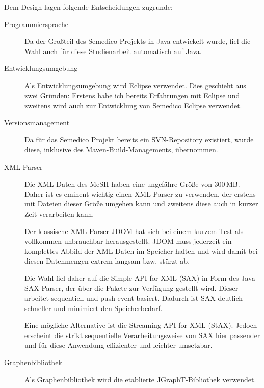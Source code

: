 Dem Design lagen folgende Entscheidungen zugrunde:
\begin{description}
\item[Programmiersprache]
Da der Großteil des Semedico Projekts in Java entwickelt wurde, fiel die Wahl auch für diese Studienarbeit automatisch auf Java. \par


\item[Entwicklungsumgebung]
Als Entwicklungsumgebung wird Eclipse verwendet. Dies geschieht aus zwei Gründen: Erstens habe ich bereits Erfahrungen mit Eclipse und zweitens wird auch zur Entwicklung von Semedico Eclipse verwendet. 

\item[Versionsmanagement]
Da für das Semedico Projekt bereits ein SVN-Repository existiert, wurde diese, inklusive des Maven-Build-Managements, übernommen.

\item[XML-Parser]
Die XML-Daten des MeSH haben eine ungefähre Größe von 300\,MB. Daher ist es eminent wichtig einen XML-Parser zu verwenden, der erstens mit Dateien dieser Größe umgehen kann und zweitens diese auch in kurzer Zeit verarbeiten kann. \par 

Der klassische XML-Parser JDOM hat sich bei einem kurzem Test als vollkommen unbrauchbar herausgestellt. JDOM muss jederzeit ein komplettes Abbild der XML-Daten im Speicher halten und wird damit bei diesen Datenmengen extrem langsam bzw. stürzt ab. \par

Die Wahl fiel daher auf die Simple API for XML (SAX) in Form des Java-SAX-Parser, der über die Pakete  zur Verfügung gestellt wird. Dieser arbeitet sequentiell und push-event-basiert. Dadurch ist SAX deutlich schneller und minimiert den Speicherbedarf. \par

Eine mögliche Alternative ist die Streaming API for XML (StAX). Jedoch erscheint die strikt sequentielle Verarbeitungsweise von SAX hier passender und für diese Anwendung effizienter und leichter umsetzbar.

\item[Graphenbibliothek]
Als Graphenbibliothek wird die etablierte JGraphT-Bibliothek verwendet. 
\end{description}

